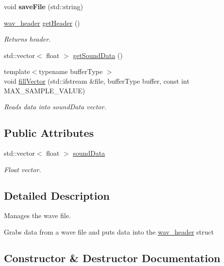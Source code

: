 \begin{DoxyCompactItemize}
void {\bfseries save\+File} (std\+::string)
\item 
\mbox{\label{classWaveFileManager_a5bfeeb7e6d17c606bdafe7a5b5641530}} 
\hyperlink{structwav__header}{wav\+\_\+header} \hyperlink{classWaveFileManager_a5bfeeb7e6d17c606bdafe7a5b5641530}{get\+Header} ()
\begin{DoxyCompactList}\small\item\em Returns header. \end{DoxyCompactList}\item 
std\+::vector$<$ float $>$ \hyperlink{classWaveFileManager_a3150c616dc01044360d4a5361392cb23}{get\+Sound\+Data} ()
\item 
{\footnotesize template$<$typename buffer\+Type $>$ }\\void \hyperlink{classWaveFileManager_a8bda282f8ec75af81b27d53b3d4b6da2}{fill\+Vector} (std\+::ifstream \&file, buffer\+Type buffer, const int M\+A\+X\+\_\+\+S\+A\+M\+P\+L\+E\+\_\+\+V\+A\+L\+UE)
\begin{DoxyCompactList}\small\item\em Reads data into sound\+Data vector. \end{DoxyCompactList}\end{DoxyCompactItemize}
\subsection*{Public Attributes}
\begin{DoxyCompactItemize}
\item 
\mbox{\label{classWaveFileManager_adac6ed307bd9b308ae768d1f06afdb76}} 
std\+::vector$<$ float $>$ \hyperlink{classWaveFileManager_adac6ed307bd9b308ae768d1f06afdb76}{sound\+Data}
\begin{DoxyCompactList}\small\item\em Float vector. \end{DoxyCompactList}\end{DoxyCompactItemize}


\subsection{Detailed Description}
Manages the wave file. 

Grabs data from a wave file and puts data into the \hyperlink{structwav__header}{wav\+\_\+header} struct 

\subsection{Constructor \& Destructor Documentation}
\mbox{\label{classWaveFileManager_ae729ebd19c43beb6779abe347a501029}} 

